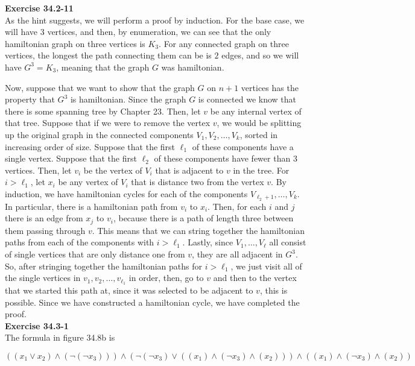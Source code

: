 \documentclass{article}
\begin{document}
\noindent\textbf{Exercise 34.2-11}\\

As the hint suggests, we will perform a proof by induction. For the base case, we will have $3$ vertices, and then, by enumeration, we can see that the only hamiltonian graph on three vertices is $K_3$. For any connected graph on three vertices, the longest the path connecting them can be is $2$ edges, and so we will have $G^3 = K_3$, meaning that the graph $G$ was hamiltonian.

Now, suppose that we want to show that the graph $G$ on $n+1$ vertices has the property that $G^3$ is hamiltonian. Since the graph $G$ is connected we know that there is some spanning tree by Chapter 23. Then, let $v$ be any internal vertex of that tree. Suppose that  if we were to remove the vertex $v$, we would be splitting up the original graph in the connected components $V_1, V_2,\ldots, V_k$, sorted in increasing order of size. Suppose that the first $\ell_1$ of these components have a single vertex. Suppose that the first $\ell_2$ of these components have fewer than $3$ vertices. Then, let $v_i$ be the vertex of $V_i$ that is adjacent to $v$ in the tree. For $i>\ell_1$, let $x_i$ be any vertex of $V_i$ that is distance two from the vertex $v$. By induction, we have hamiltonian cycles for each of the components $V_{\ell_2+1}, \ldots, V_k$. In particular, there is a hamiltonian path from $v_i$ to $x_i$. Then, for each $i$ and $j$ there is an edge from $x_j$ to $v_i$, because there is a path of length three between them passing through $v$. This means that we can string together the hamiltonian paths from each of the components with $i>\ell_1$. Lastly, since $V_1, \ldots, V_{\ell}$ all consist of single vertices that are only distance one from $v$, they are all adjacent in $G^3$. So, after stringing together the hamiltonian paths for $i>\ell_1$, we just visit all of the single vertices in $v_1,v_2,\ldots, v_{\ell_1}$ in order, then, go to $v$ and then to the vertex that we started this path at, since it was selected to be adjacent to $v$, this is possible. Since we have constructed a hamiltonian cycle, we have completed the proof.\\



\noindent\textbf{Exercise 34.3-1}\\

The formula in figure 34.8b is 

\[((x_1\vee x_2)\wedge(\neg(\neg x_3)))\wedge(\neg(\neg x_3) \vee ((x_1)\wedge(\neg x_3)\wedge(x_2)))\wedge((x_1)\wedge(\neg x_3)\wedge(x_2))\]
\end{document}
